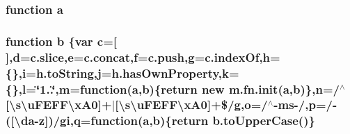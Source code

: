 \subsubsection[{a}]{\setlength{\rightskip}{0pt plus 5cm}function a}\label{_admin_2application_2assets_2js_2jquery-1_811_82_8min_8js_aa4d4888597588a84fd5b1184d00c91f3}
\hypertarget{_admin_2application_2assets_2js_2jquery-1_811_82_8min_8js_ac0431efac4d7c393d1e70b86115cb93f}{}
\subsubsection[{b}]{\setlength{\rightskip}{0pt plus 5cm}function b \{var {\bf c}=\mbox{[}$\,$\mbox{]},{\bf d}=c.\+slice,{\bf e}=c.\+concat,f=c.\+push,g=c.\+index\+Of,h=\{\},i=h.\+to\+String,j=h.\+has\+Own\+Property,k=\{\},l=\char`\"{}1..\char`\"{},m=function({\bf a},b)\{return new m.\+fn.\+init({\bf a},b)\},{\bf n}=/$^\wedge$\mbox{[}\textbackslash{}s\textbackslash{}u\+F\+E\+F\+F\textbackslash{}x\+A0\mbox{]}+$\vert$\mbox{[}\textbackslash{}s\textbackslash{}u\+F\+E\+F\+F\textbackslash{}x\+A0\mbox{]}+\$/g,o=/$^\wedge$-\/ms-\//,p=/-\/(\mbox{[}\textbackslash{}da-\/z\mbox{]})/gi,q=function({\bf a},b)\{return b.\+to\+Upper\+Case()\}}\label{_admin_2application_2assets_2js_2jquery-1_811_82_8min_8js_ac0431efac4d7c393d1e70b86115cb93f}
\hypertarget{_admin_2application_2assets_2js_2jquery-1_811_82_8min_8js_a167947be5252c14d5389d8a01a8c8545}{}
